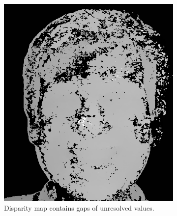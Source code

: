\documentclass[journal]{IEEEtran}
\begin{document}
\begin{figure}[h]
    \centering
    \begin{subfigure}[t]{0.45\linewidth}
        \centering
        \includegraphics[width=\linewidth]{Pics/disparity-gaps.png}
        \caption{Disparity map contains gaps of unresolved values.}
        \label{fig:disparity-gaps}
    \end{subfigure}
    ~
    \begin{subfigure}[t]{0.45\linewidth}
        \centering

\end{subfigure}
\end{figure}
\end{document}
